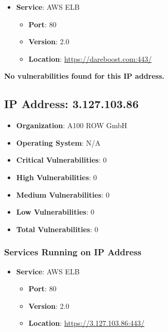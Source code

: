 \documentclass{article}
\begin{document}
\begin{itemize}
    
        \item \textbf{Service}: AWS ELB
        \begin{itemize}
            \item \textbf{Port}: 80
            \item \textbf{Version}:  2.0 
            \item \textbf{Location}: \href{ https://dareboost.com:443/ }{ https://dareboost.com:443/ }
        \end{itemize}
    
\end{itemize}


\textbf{No vulnerabilities found for this IP address.}




\clearpage



\subsection*{IP Address: 3.127.103.86}

\begin{itemize}
    \item \textbf{Organization}: A100 ROW GmbH
    \item \textbf{Operating System}:  N/A 
    \item \textbf{Critical Vulnerabilities}: 0
    \item \textbf{High Vulnerabilities}: 0
    \item \textbf{Medium Vulnerabilities}: 0
    \item \textbf{Low Vulnerabilities}: 0
    \item \textbf{Total Vulnerabilities}: 0
\end{itemize}

\subsubsection*{Services Running on IP Address}

\begin{itemize}
    
        \item \textbf{Service}: AWS ELB
        \begin{itemize}
            \item \textbf{Port}: 80
            \item \textbf{Version}:  2.0 
            \item \textbf{Location}: \href{ https://3.127.103.86:443/ }{ https://3.127.103.86:443/ }
        \end{itemize}
    
\end{itemize}
\end{document}

